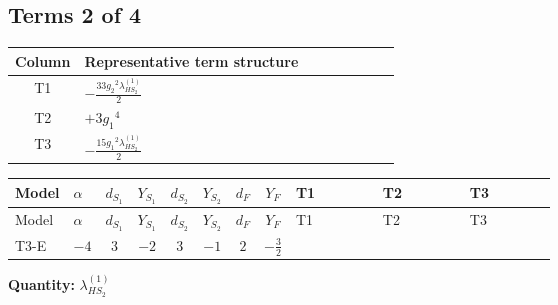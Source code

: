 \documentclass[8pt]{article}
\begin{document}
\begin{landscape}
\subsection*{Terms 2 of 4}
\begin{center}
\begin{tabular}{@{}c >{\raggedright\arraybackslash}p{0.82\linewidth}@{}}
\toprule
Column & Representative term structure \\
\midrule
T1 & \(\displaystyle -\frac{33 {g_2}^2 {\lambda_{HS_2}^{(1)}}}{2}\) \\
\midrule
T2 & \(\displaystyle +3 {g_1}^4\) \\
\midrule
T3 & \(\displaystyle -\frac{15 {g_1}^2 {\lambda_{HS_2}^{(1)}}}{2}\) \\
\midrule
\bottomrule
\end{tabular}
\end{center}
\smallskip
\tiny
\begin{longtable}{@{}llcccccc >{\raggedright\arraybackslash}p{0.21\linewidth} >{\raggedright\arraybackslash}p{0.21\linewidth} >{\raggedright\arraybackslash}p{0.21\linewidth}@{}}
\toprule
Model & $\alpha$ & $d_{S_1}$ & $Y_{S_1}$ & $d_{S_2}$ & $Y_{S_2}$ & $d_F$ & $Y_F$ & T1 & T2 & T3 \\
\midrule
\endfirsthead
\toprule
Model & $\alpha$ & $d_{S_1}$ & $Y_{S_1}$ & $d_{S_2}$ & $Y_{S_2}$ & $d_F$ & $Y_F$ & T1 & T2 & T3 \\
\midrule
\endhead
T3-E & $-4$ & $3$ & $-2$ & $3$ & $-1$ & $2$ & $-\frac{3}{2}$ & \scriptsize\adjustbox{max width=\linewidth}{$\begin{gathered} -\frac{33 {g_2}^2 {\lambda_{HS_2}^{(1)}}}{2}\end{gathered}$} & \scriptsize\adjustbox{max width=\linewidth}{$\begin{gathered} +3 {g_1}^4\end{gathered}$} & \scriptsize\adjustbox{max width=\linewidth}{$\begin{gathered} -\frac{15 {g_1}^2 {\lambda_{HS_2}^{(1)}}}{2}\end{gathered}$} \\
\midrule
\bottomrule
\end{longtable}
\clearpage
\noindent\textbf{Quantity: }$\lambda_{HS_2}^{(1)}$\par\smallskip

\end{landscape}
\end{document}
